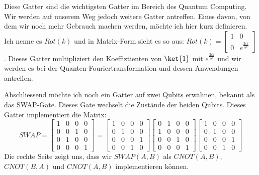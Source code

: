 Diese Gatter sind die wichtigsten Gatter im Bereich des Quantum Computing. Wir werden auf unserem Weg jedoch weitere Gatter antreffen. Eines davon, von dem wir noch mehr Gebrauch machen werden, möchte ich hier kurz definieren. Ich nenne es $Rot(k)$ und in Matrix-Form sieht es so aus: $Rot(k) = \begin{bmatrix}1 & 0 \\ 0 & e^{\frac{2i\pi}{2^k}}\end{bmatrix}$. Dieses Gatter multipliziert den Koeffiztienten von $\ket{1}$ mit $e^{\frac{2i\pi}{2^k}}$ und wir werden es bei der Quanten-Fouriertransformation und dessen Anwendungen antreffen.

Abschliessend möchte ich noch ein Gatter auf zwei Qubits erwähnen, bekannt als das SWAP-Gate. Dieses Gate wechselt die Zustände der beiden Qubits. Dieses Gatter implementiert die Matrix: $$ SWAP = \begin{bmatrix} 1 & 0 & 0 & 0 \\ 0 & 0 & 1 & 0 \\ 0 & 1 & 0 & 0 \\ 0 & 0 & 0 & 1 \end{bmatrix} = \begin{bmatrix}1 & 0 & 0 & 0 \\ 0 & 1 & 0 & 0 \\ 0 & 0 & 0 & 1 \\ 0 & 0 & 1 & 0\end{bmatrix} \begin{bmatrix}0 & 1 & 0 & 0 \\ 1 & 0 & 0 & 0 \\ 0 & 0 & 1 & 0 \\ 0 & 0 & 0 & 1 \end{bmatrix} \begin{bmatrix}1 & 0 & 0 & 0 \\ 0 & 1 & 0 & 0 \\ 0 & 0 & 0 & 1 \\ 0 & 0 & 1 & 0\end{bmatrix}$$
Die rechte Seite zeigt uns, dass wir $SWAP(A, B)$ als $CNOT(A, B)$, $CNOT(B, A)$ und $CNOT(A, B)$ implementieren können.